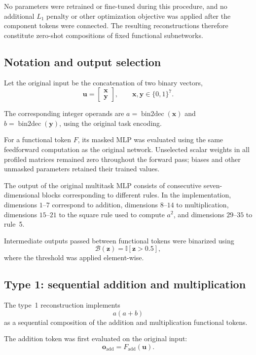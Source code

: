 \documentclass{article}
\begin{document}
No parameters were retrained or fine-tuned during this procedure, and no additional $L_1$ penalty or other optimization objective was applied after the component tokens were connected. The resulting reconstructions therefore constitute zero-shot compositions of fixed functional subnetworks.

\subsection{Notation and output selection}

Let the original input be the concatenation of two binary vectors,
\[
\mathbf{u}
=
\begin{bmatrix}
\mathbf{x}\\
\mathbf{y}
\end{bmatrix},
\qquad
\mathbf{x},\mathbf{y}\in\{0,1\}^{7}.
\]

The corresponding integer operands are $a=\operatorname{bin2dec}(\mathbf{x})$ and $b=\operatorname{bin2dec}(\mathbf{y})$, using the original task encoding.

For a functional token $F$, its masked MLP was evaluated using the same feedforward computation as the original network. Unselected scalar weights in all profiled matrices remained zero throughout the forward pass; biases and other unmasked parameters retained their trained values.

The output of the original multitask MLP consists of consecutive seven-dimensional blocks corresponding to different rules. In the implementation, dimensions $1$--$7$ correspond to addition, dimensions $8$--$14$ to multiplication, dimensions $15$--$21$ to the square rule used to compute $a^2$, and dimensions $29$--$35$ to rule~5.

Intermediate outputs passed between functional tokens were binarized using
\[
\mathcal{B}(\mathbf{z})
=
\mathbb{I}\!\left[\mathbf{z}>0.5\right],
\]
where the threshold was applied element-wise.

\subsection{Type 1: sequential addition and multiplication}

The type~1 reconstruction implements
\[
a(a+b)
\]
as a sequential composition of the addition and multiplication functional tokens.

The addition token was first evaluated on the original input:
\[
\mathbf{o}_{\mathrm{add}}
=
F_{\mathrm{add}}(\mathbf{u}).
\]
\end{document}
